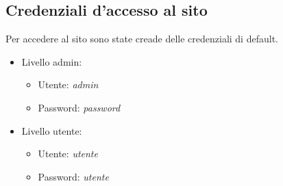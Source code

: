 \subsection{Credenziali d'accesso al sito}
Per accedere al sito sono state creade delle credenziali di default.
\begin{itemize}

    \item Livello admin:
    \begin{itemize}

        \item Utente: \textit{admin}
        \item Password: \textit{password}

    \end{itemize}

    \item Livello utente:
    \begin{itemize}

        \item Utente: \textit{utente}
        \item Password: \textit{utente}

    \end{itemize}

\end{itemize}
